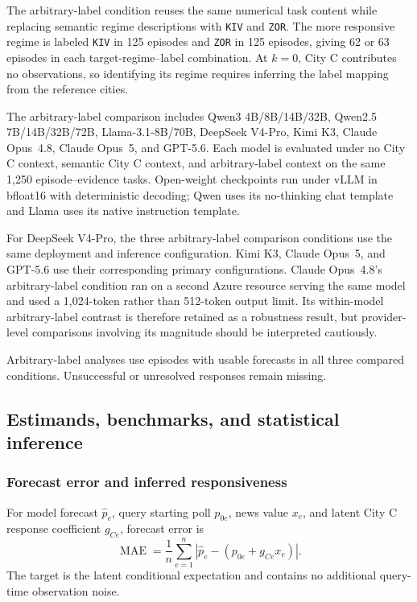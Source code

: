 The arbitrary-label condition reuses the same numerical task content while replacing semantic regime descriptions with \texttt{KIV} and \texttt{ZOR}.
The more responsive regime is labeled \texttt{KIV} in 125 episodes and \texttt{ZOR} in 125 episodes, giving 62 or 63 episodes in each target-regime--label combination.
At \(k=0\), City C contributes no observations, so identifying its regime requires inferring the label mapping from the reference cities.

The arbitrary-label comparison includes Qwen3 4B/8B/14B/32B, Qwen2.5 7B/14B/32B/72B, Llama-3.1-8B/70B, DeepSeek V4-Pro, Kimi K3, Claude Opus~4.8, Claude Opus~5, and GPT-5.6.
Each model is evaluated under no City C context, semantic City C context, and arbitrary-label context on the same 1,250 episode--evidence tasks.
Open-weight checkpoints run under vLLM in bfloat16 with deterministic decoding; Qwen uses its no-thinking chat template and Llama uses its native instruction template.

For DeepSeek V4-Pro, the three arbitrary-label comparison conditions use the same deployment and inference configuration.
Kimi K3, Claude Opus~5, and GPT-5.6 use their corresponding primary configurations.
Claude Opus~4.8's arbitrary-label condition ran on a second Azure resource serving the same model and used a 1,024-token rather than 512-token output limit.
Its within-model arbitrary-label contrast is therefore retained as a robustness result, but provider-level comparisons involving its magnitude should be interpreted cautiously.

Arbitrary-label analyses use episodes with usable forecasts in all three compared conditions.
Unsuccessful or unresolved responses remain missing.

\subsection{Estimands, benchmarks, and statistical inference}
\label{app:coin-city-analysis}

\subsubsection{Forecast error and inferred responsiveness}

For model forecast \(\widehat p_e\), query starting poll \(p_{0e}\), news value \(x_e\), and latent City C response coefficient \(g_{Ce}\), forecast error is
\[
\operatorname{MAE}
=
\frac{1}{n}
\sum_{e=1}^{n}
\left|
\widehat p_e-(p_{0e}+g_{Ce}x_e)
\right|.
\]
The target is the latent conditional expectation and contains no additional query-time observation noise.

